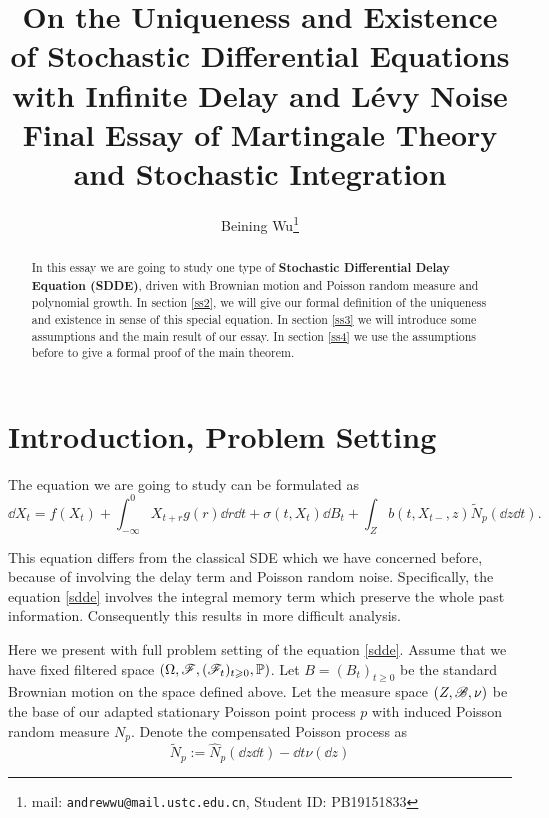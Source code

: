 \documentclass[8pt,onesided]{article}
\begin{document}
{
\title{\color{BlueViolet} On the Uniqueness and Existence of Stochastic Differential Equations with Infinite Delay and L\'evy Noise\vspace*{.5em}\\  \large Final Essay of Martingale Theory and Stochastic Integration}
\author{Beining Wu\footnote{mail: \texttt{andrewwu@mail.ustc.edu.cn}, Student ID: PB19151833}}
\maketitle
}

\begin{abstract}
    In this essay we are going to study one type of \textbf{Stochastic Differential Delay Equation (SDDE)}, driven with Brownian motion and Poisson random measure and polynomial growth. In section \ref{ss2}, we will give our formal definition of the uniqueness and existence in sense of this special equation. In section \ref{ss3} we will introduce some assumptions and the main result of our essay. In section \ref{ss4} we use the assumptions before to give a formal proof of the main theorem.
\end{abstract}

\section{Introduction, Problem Setting}

The equation we are going to study can be formulated as
\begin{equation}
    \label{sdde}
    \dd X_t=f(X_t)+\int_{ -\infty}^0 X_{t+r} g(r) \dd r \dd t+\sigma(t,X_t)\dd B_t+\int_Z b(t, X_{t-},z)\tilde N_p(\dd z \dd t).
\end{equation}

This equation differs from the classical SDE which we have concerned before, because of involving the delay term and Poisson random noise. Specifically, the equation \ref{sdde} involves the integral memory term which preserve the whole past information. Consequently this results in more difficult analysis.

Here we present with full problem setting of the equation \ref{sdde}. Assume that we have fixed filtered space $(\Omega, \mathscr{F}, (\mathscr{F}_t)_{t\geqslant 0},\mathbb{P})$. Let $B=(B_t)_{t\ge 0}$ be the standard Brownian motion on the space defined above. Let the measure space $(Z, \mathscr{B}, \nu)$ be the base of our adapted stationary Poisson point process $p$ with induced Poisson random measure $N_p$. Denote the compensated Poisson process as
\begin{equation*}
    \tilde N_p:=\hat N_p(\dd z \dd t)- \dd t \nu (\dd z)
\end{equation*}
\end{document}
